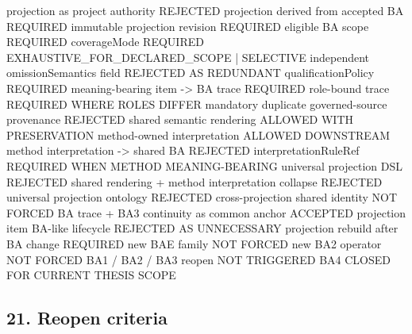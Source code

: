 \documentclass[
  11pt,
  a4paper,
]{article}
\newenvironment{Shaded}{}{}
\newcommand{\NormalTok}[1]{#1}
\begin{document}
\begin{Shaded}
\begin{Highlighting}[]
\NormalTok{projection as project authority                         REJECTED}
\NormalTok{projection derived from accepted BA                     REQUIRED}
\NormalTok{immutable projection revision                           REQUIRED}
\NormalTok{eligible BA scope                                       REQUIRED}
\NormalTok{coverageMode                                            REQUIRED}
\NormalTok{  EXHAUSTIVE\_FOR\_DECLARED\_SCOPE | SELECTIVE}
\NormalTok{independent omissionSemantics field                     REJECTED AS REDUNDANT}
\NormalTok{qualificationPolicy                                     REQUIRED}
\NormalTok{meaning{-}bearing item {-}\textgreater{} BA trace                        REQUIRED}
\NormalTok{role{-}bound trace                                        REQUIRED WHERE ROLES DIFFER}
\NormalTok{mandatory duplicate governed{-}source provenance          REJECTED}
\NormalTok{shared semantic rendering                               ALLOWED WITH PRESERVATION}
\NormalTok{method{-}owned interpretation                             ALLOWED DOWNSTREAM}
\NormalTok{method interpretation {-}\textgreater{} shared BA                      REJECTED}
\NormalTok{interpretationRuleRef                                   REQUIRED WHEN METHOD MEANING{-}BEARING}
\NormalTok{universal projection DSL                                REJECTED}
\NormalTok{shared rendering + method interpretation collapse       REJECTED}
\NormalTok{universal projection ontology                           REJECTED}
\NormalTok{cross{-}projection shared identity                        NOT FORCED}
\NormalTok{BA trace + BA3 continuity as common anchor              ACCEPTED}
\NormalTok{projection item BA{-}like lifecycle                       REJECTED AS UNNECESSARY}
\NormalTok{projection rebuild after BA change                      REQUIRED}
\NormalTok{new BAE family                                          NOT FORCED}
\NormalTok{new BA2 operator                                        NOT FORCED}
\NormalTok{BA1 / BA2 / BA3 reopen                                  NOT TRIGGERED}
\NormalTok{BA4                                                     CLOSED FOR CURRENT THESIS SCOPE}
\end{Highlighting}
\end{Shaded}

\subsection{21. Reopen criteria}\label{reopen-criteria}
\end{document}
